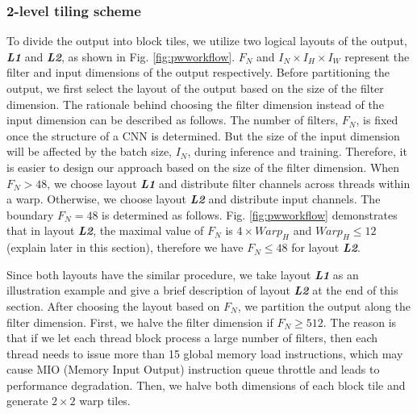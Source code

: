 \subsubsection{2-level tiling scheme}
To divide the output into block tiles, we utilize two logical layouts of the output, \textbf{\emph{L1}} and \textbf{\emph{L2}}, as shown in Fig. \ref{fig:pwworkflow}.
$F_N$ and $I_N \times I_H \times I_W$ represent the filter and input dimensions of the output respectively.
Before partitioning the output, we first select the layout of the output based on the size of the filter dimension.
The rationale behind choosing the filter dimension instead of the input dimension can be described as follows.
The number of filters, $F_N$, is fixed once the structure of a CNN is determined.
But the size of the input dimension will be affected by the batch size, $I_N$, during inference and training.
Therefore, it is easier to design our approach based on the size of the filter dimension.
When $F_N > 48$, we choose layout \textbf{\emph{L1}} and distribute filter channels across threads within a warp.
Otherwise, we choose layout \textbf{\emph{L2}} and distribute input channels.
The boundary $F_N = 48$ is determined as follows.
Fig. \ref{fig:pwworkflow} demonstrates that in layout \textbf{\emph{L2}}, the maximal value of $F_N$ is $4 \times Warp_H$ and $Warp_H \leq 12$ (explain later in this section), therefore we have $F_N \leq 48$ for layout \textbf{\emph{L2}}.

Since both layouts have the similar procedure, we take layout \textbf{\emph{L1}} as an illustration example and give a brief description of layout \textbf{\emph{L2}} at the end of this section.
After choosing the layout based on $F_N$, we partition the output along the filter dimension.
First, we halve the filter dimension if $F_N \geq 512$.
The reason is that if we let each thread block process a large number of filters, then each thread needs to issue more than 15 global memory load instructions, which may cause MIO (Memory Input Output) instruction queue throttle and leads to performance degradation.
Then, we halve both dimensions of each block tile and generate $2 \times 2$ warp tiles.
